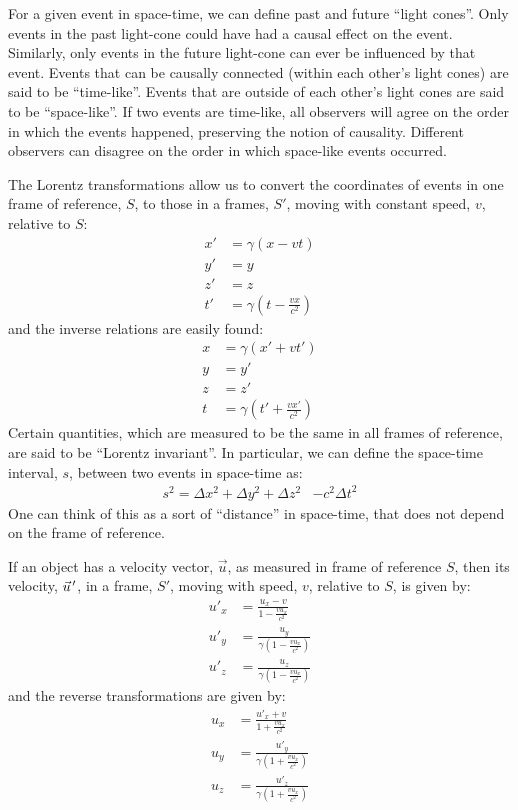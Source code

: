 \begin{chapterSummary}
For a given event in space-time, we can define past and future ``light cones''. Only events in the past light-cone could have had a causal effect on the event. Similarly, only events in the future light-cone can ever be influenced by that event. Events that can be causally connected (within each other's light cones) are said to be ``time-like''. Events that are outside of each other's light cones are said to be ``space-like''. If two events are time-like, all observers will agree on the order in which the events happened, preserving the notion of causality. Different observers can disagree on the order in which space-like events occurred. 

The Lorentz transformations allow us to convert the coordinates of events in one frame of reference, $S$, to those in a frames, $S'$, moving with constant speed, $v$, relative to $S$:
\begin{align*}
x' &=\gamma (x-vt)\\
y' &= y\\
z' &= z\\
t' &=\gamma\left(t-\frac{vx}{c^2} \right)
\end{align*}
and the inverse relations are easily found:
\begin{align*}
x &=\gamma (x'+vt')\\
y &= y'\\
z &= z'\\
t &=\gamma\left(t'+\frac{vx'}{c^2} \right)
\end{align*}
Certain quantities, which are measured to be the same in all frames of reference, are said to be ``Lorentz invariant''. In particular, we can define the space-time interval, $s$, between two events in space-time as:
\begin{align*}
s^2 = \Delta x^2 + \Delta y^2 +\Delta z^2&-c^2\Delta t^2
\end{align*}
One can think of this as a sort of ``distance'' in space-time, that does not depend on the frame of reference.

If an object has a velocity vector, $\vec u$, as measured in frame of reference $S$, then its velocity, $\pvec u'$, in a frame, $S'$, moving with speed, $v$, relative to $S$, is given by:
\begin{align*}
u'_x&=\frac{u_x -v}{1- \frac{vu_x}{c^2}}\\
u'_y &=\frac{u_y}{\gamma\left(1- \frac{vu_x}{c^2}\right)}\\
u'_z &=\frac{u_z}{\gamma\left(1- \frac{vu_x}{c^2}\right)}
\end{align*}
and the reverse transformations are given by:
\begin{align*}
u_x &=\frac{u'_x +v}{1+ \frac{vu_x}{c^2}}\\
u_y &=\frac{u'_y}{\gamma\left(1+ \frac{vu_x}{c^2}\right)}\\
u_z &=\frac{u'_z}{\gamma\left(1+ \frac{vu_x}{c^2}\right)}
\end{align*}


\end{chapterSummary}
